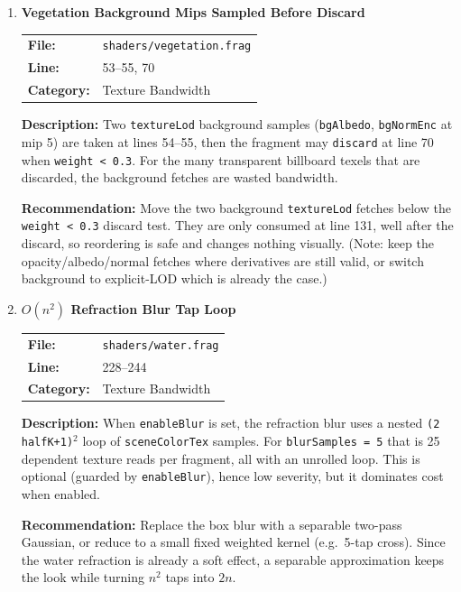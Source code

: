 \documentclass[a4paper,12pt]{article}
\newcommand{\severitybox}[2]{%
  \colorbox{#1}{\makebox[2.5cm][c]{\textcolor{white}{\textbf{#2}}}}%
}
\begin{document}
\begin{enumerate}[leftmargin=*]

\item[\textbf{[SH10]}] \textbf{Vegetation Background Mips Sampled Before Discard}
  \hfill \severitybox{lowcolor}{LOW}

  \begin{tabular}{ll}
    \textbf{File:} & \texttt{shaders/vegetation.frag} \\
    \textbf{Line:} & 53--55, 70 \\
    \textbf{Category:} & Texture Bandwidth \\
  \end{tabular}

  \textbf{Description:}
  Two \texttt{textureLod} background samples (\texttt{bgAlbedo},
  \texttt{bgNormEnc} at mip 5) are taken at lines 54--55, then the fragment may
  \texttt{discard} at line 70 when \texttt{weight < 0.3}. For the many
  transparent billboard texels that are discarded, the background fetches are
  wasted bandwidth.

  \textbf{Recommendation:}
  Move the two background \texttt{textureLod} fetches below the
  \texttt{weight < 0.3} discard test. They are only consumed at line 131, well
  after the discard, so reordering is safe and changes nothing visually. (Note:
  keep the opacity/albedo/normal fetches where derivatives are still valid, or
  switch background to explicit-LOD which is already the case.)

\item[\textbf{[SH11]}] \textbf{$O(n^2)$ Refraction Blur Tap Loop}
  \hfill \severitybox{lowcolor}{LOW}

  \begin{tabular}{ll}
    \textbf{File:} & \texttt{shaders/water.frag} \\
    \textbf{Line:} & 228--244 \\
    \textbf{Category:} & Texture Bandwidth \\
  \end{tabular}

  \textbf{Description:}
  When \texttt{enableBlur} is set, the refraction blur uses a nested
  \texttt{(2\,halfK+1)$^2$} loop of \texttt{sceneColorTex} samples. For
  \texttt{blurSamples = 5} that is 25 dependent texture reads per fragment, all
  with an unrolled loop. This is optional (guarded by \texttt{enableBlur}), hence
  low severity, but it dominates cost when enabled.

  \textbf{Recommendation:}
  Replace the box blur with a separable two-pass Gaussian, or reduce to a small
  fixed weighted kernel (e.g.\ 5-tap cross). Since the water refraction is
  already a soft effect, a separable approximation keeps the look while turning
  $n^2$ taps into $2n$.


\end{enumerate}
\end{document}
